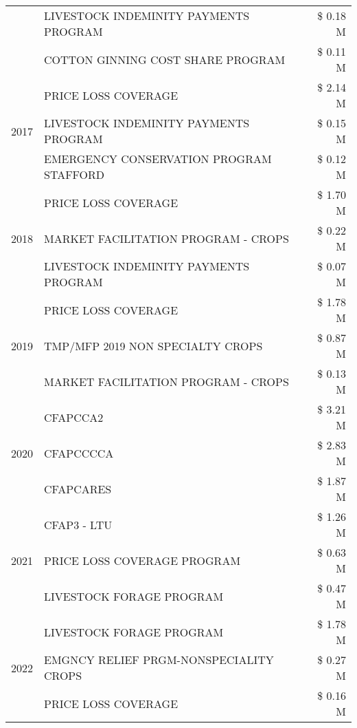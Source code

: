 \begin{tabular}{llr}
 & LIVESTOCK INDEMINITY PAYMENTS PROGRAM & \$ 0.18 M \\
 & COTTON GINNING COST SHARE PROGRAM & \$ 0.11 M \\
\cline{1-3}
\multirow[t]{3}{*}{2017} & PRICE LOSS COVERAGE & \$ 2.14 M \\
 & LIVESTOCK INDEMINITY PAYMENTS PROGRAM & \$ 0.15 M \\
 & EMERGENCY CONSERVATION PROGRAM STAFFORD & \$ 0.12 M \\
\cline{1-3}
\multirow[t]{3}{*}{2018} & PRICE LOSS COVERAGE & \$ 1.70 M \\
 & MARKET FACILITATION PROGRAM - CROPS & \$ 0.22 M \\
 & LIVESTOCK INDEMINITY PAYMENTS PROGRAM & \$ 0.07 M \\
\cline{1-3}
\multirow[t]{3}{*}{2019} & PRICE LOSS COVERAGE & \$ 1.78 M \\
 & TMP/MFP 2019 NON SPECIALTY CROPS & \$ 0.87 M \\
 & MARKET FACILITATION PROGRAM - CROPS & \$ 0.13 M \\
\cline{1-3}
\multirow[t]{3}{*}{2020} & CFAPCCA2 & \$ 3.21 M \\
 & CFAPCCCCA & \$ 2.83 M \\
 & CFAPCARES & \$ 1.87 M \\
\cline{1-3}
\multirow[t]{3}{*}{2021} & CFAP3 - LTU & \$ 1.26 M \\
 & PRICE LOSS COVERAGE PROGRAM & \$ 0.63 M \\
 & LIVESTOCK FORAGE PROGRAM & \$ 0.47 M \\
\cline{1-3}
\multirow[t]{3}{*}{2022} & LIVESTOCK FORAGE PROGRAM & \$ 1.78 M \\
 & EMGNCY RELIEF PRGM-NONSPECIALITY CROPS & \$ 0.27 M \\
 & PRICE LOSS COVERAGE & \$ 0.16 M \\
\cline{1-3}
\bottomrule
\end{tabular}
